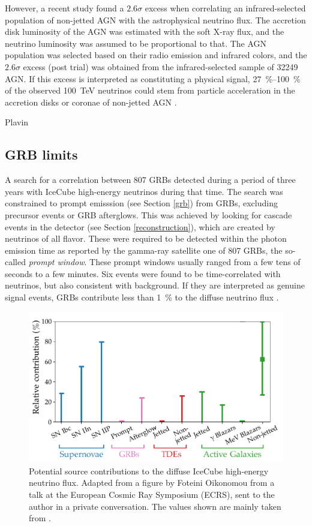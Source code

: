 \documentclass[
    a4paper, %
    fontsize=10pt, %
    twoside=false, %
    numbers=noenddot, %
    fontmethod=tex,
]{kaobook}
\begin{document}
However, a recent study found a $2.6\sigma$ excess when correlating an infrared-selected population of non-jetted AGN with the astrophysical neutrino flux. The accretion disk luminosity of the AGN was estimated with the soft X-ray flux, and the neutrino luminosity was assumed to be proportional to that. The AGN population was selected based on their radio emission and infrared colors, and the $2.6\sigma$ excess (post trial) was obtained from the infrared-selected sample of 32249 AGN. If this excess is interpreted as constituting a physical signal, \SIrange{27}{100}{\percent} of the observed \SI{100}{\tera\eV} neutrinos could stem from particle acceleration in the accretion disks or coronae of non-jetted AGN .

Plavin

\subsection{GRB limits}
A search for a correlation between 807 GRBs detected during a period of three years with IceCube high-energy neutrinos during that time. The search was constrained to prompt emisssion (see Section \ref{grb}) from GRBs, excluding precursor events or GRB afterglows. This was achieved by looking for cascade events in the detector (see Section \ref{reconstruction}), which are created by neutrinos of all flavor. These were required to be detected within the photon emission time as reported by the gamma-ray satellite one of 807 GRBs, the so-called \textit{prompt window}. These prompt windows usually ranged from a few tens of seconds to a few minutes. Six events were found to be time-correlated with neutrinos, but also consistent with background. If they are interpreted as genuine signal events, GRBs contribute less than \SI{1}{\percent} to the diffuse neutrino flux .

\begin{figure}[htb]
    \includegraphics[width=1\textwidth]{theory/ul.pdf}
    \caption[Contribution to HE neutrino flux]{Potential source contributions to the diffuse IceCube high-energy neutrino flux. Adapted from a figure by Foteini Oikonomou from a talk at the  European Cosmic Ray Symposium (ECRS), sent to the author in a private conversation. The values shown are mainly taken from \cite{Guepin2022}.}
\end{figure}
\end{document}
